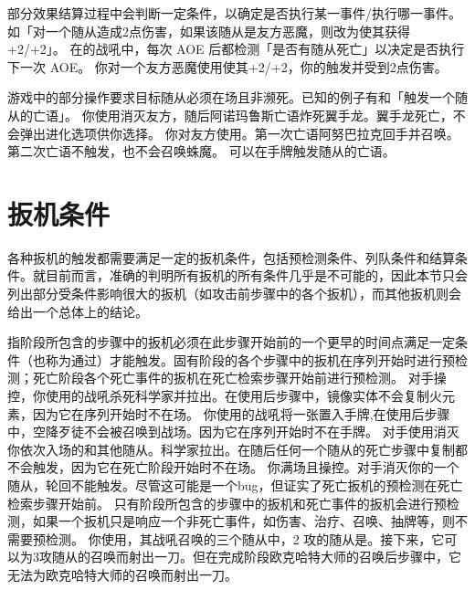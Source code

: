 部分效果结算过程中会判断一定条件，以确定是否执行某一事件/执行哪一事件。如「对一个随从造成2点伤害，如果该随从是友方恶魔，则改为使其获得+2/+2」。
\example 在的战吼中，每次 AOE 后都检测「是否有随从死亡」以决定是否执行下一次 AOE。
\example 你对一个友方恶魔使用使其+2/+2，你的触发并受到2点伤害。

游戏中的部分操作要求目标随从必须在场且非濒死。已知的例子有和「触发一个随从的亡语」。
\example 你使用消灭友方，随后阿诺玛鲁斯亡语炸死翼手龙。翼手龙死亡，不会弹出进化选项供你选择。
\example 你对友方使用。第一次亡语阿努巴拉克回手并召唤。第二次亡语不触发，也不会召唤蛛魔。
\exception {}可以在手牌触发随从的亡语。

\section{扳机条件}
\label{trigger-cond}

各种扳机的触发都需要满足一定的扳机条件，包括预检测条件、列队条件和结算条件。就目前而言，准确的判明所有扳机的所有条件几乎是不可能的，因此本节只会列出部分受条件影响很大的扳机（如攻击前步骤中的各个扳机），而其他扳机则会给出一个总体上的结论。

指阶段所包含的步骤中的扳机必须在此步骤开始前的一个更早的时间点满足一定条件（也称为通过）才能触发。固有阶段的各个步骤中的扳机在序列开始时进行预检测；死亡阶段各个死亡事件的扳机在死亡检索步骤开始前进行预检测。
\example 对手操控，你使用的战吼杀死科学家并拉出。在使用后步骤中，镜像实体不会复制火元素，因为它在序列开始时不在场。
\example 你使用的战吼将一张置入手牌,在使用后步骤中，空降歹徒不会被召唤到战场。因为它在序列开始时不在手牌。
\example 对手使用消灭你依次入场的和其他随从。科学家拉出。在随后任何一个随从的死亡步骤中复制都不会触发，因为它在死亡阶段开始时不在场。
\example 你满场且操控。对手消灭你的一个随从，轮回不能触发。尽管这可能是一个bug，但证实了死亡扳机的预检测在死亡检索步骤开始前。
\notice 只有阶段所包含的步骤中的扳机和死亡事件的扳机会进行预检测，如果一个扳机只是响应一个非死亡事件，如伤害、治疗、召唤、抽牌等，则不需要预检测。
\example 你使用，其战吼召唤的三个随从中，2 攻的随从是。接下来，它可以为3攻随从的召唤而射出一刀。但在完成阶段欧克哈特大师的召唤后步骤中，它无法为欧克哈特大师的召唤而射出一刀。

